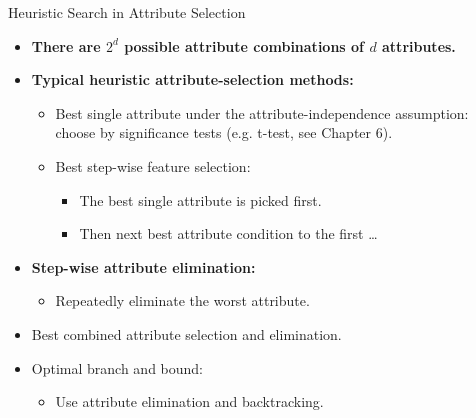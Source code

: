 \begin{frame}{Heuristic Search in Attribute Selection}
	\begin{itemize}
		\item \textbf{There are $2^d$ possible attribute combinations of $d$
			      attributes.}
		      \item\textbf{\color{airforceblue}Typical heuristic attribute-selection
			      methods:}
		      \begin{itemize}
			      \item Best single attribute under the attribute-independence
			            assumption: \\ choose by significance tests (e.g. t-test, see
			            Chapter 6).
			      \item Best step-wise feature selection:
			            \begin{itemize}
				            \item The best single attribute is picked first.
				            \item Then next best attribute condition to the first \ldots
			            \end{itemize}
		      \end{itemize}
		\item \textbf{\color{airforceblue}Step-wise attribute elimination:}
		      \begin{itemize}
			      \item Repeatedly eliminate the worst attribute.
		      \end{itemize}
		\item Best combined attribute selection and elimination.
		\item Optimal branch and bound:
		      \begin{itemize}
			      \item Use attribute elimination and backtracking.
		      \end{itemize}
	\end{itemize}
\end{frame}

